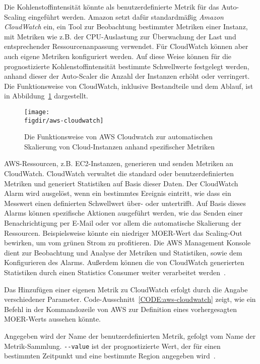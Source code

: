 Die Kohlenstoffintensität könnte als benutzerdefinierte Metrik für das Auto-Scaling eingeführt werden.
Amazon setzt dafür standardmäßig \textit{Amazon CloudWatch} ein, ein Tool zur Beobachtung bestimmter Metriken einer Instanz, mit Metriken wie z.B. der \ac{CPU}-Auslastung zur Überwachung der Last und entsprechender Ressourcenanpassung verwendet.
Für CloudWatch können aber auch eigene Metriken konfiguriert werden.
Auf diese Weise können für die prognostizierte Kohlenstoffintensität bestimmte Schwellwerte festgelegt werden, anhand dieser der Auto-Scaler die Anzahl der Instanzen erhöht oder verringert.
Die Funktionsweise von CloudWatch, inklusive Bestandteile und dem Ablauf, ist in Abbildung~\ref{FIG:aws-cloudwatch} dargestellt.
\begin{figure}
 \caption[Funktionsweise AWS Cloudwatch]{Die Funktionsweise von \ac{AWS} Cloudwatch zur automatischen Skalierung von Cloud-Instanzen anhand spezifischer Metriken~\cite{AmazonWebServices.20240320T16:42:17.000Z}}
 {\texttt{[image: \\figdir/aws-cloudwatch]}}
 \label{FIG:aws-cloudwatch}
\end{figure}
AWS-Ressourcen, z.B. EC2-Instanzen, generieren und senden Metriken an CloudWatch.
CloudWatch verwaltet die standard oder benutzerdefinierten Metriken und generiert Statistiken auf Basis dieser Daten.
Der CloudWatch Alarm wird ausgelöst, wenn ein bestimmtes Ereignis eintritt, wie dass ein Messwert einen definierten Schwellwert über- oder untertrifft.
Auf Basis dieses Alarms können spezifische Aktionen ausgeführt werden, wie das Senden einer Benachrichtigung per E-Mail oder vor allem die automatische Skalierung der Ressourcen.
Beispielsweise könnte ein niedriger \ac{MOER}-Wert das Scaling-Out bewirken, um vom grünen Strom zu profitieren.
Die AWS Management Konsole dient zur Beobachtung und Analyse der Metriken und Statistiken, sowie dem Konfigurieren des Alarms.
Außerdem können die von CloudWatch generierten Statistiken durch einen Statistics Consumer weiter verarbeitet werden~\cite{AmazonWebServices.20240320T16:42:17.000Z}.

Das Hinzufügen einer eigenen Metrik zu CloudWatch erfolgt durch die Angabe verschiedener Parameter.
Code-Ausschnitt~\ref{CODE:aws-cloudwatch} zeigt, wie ein Befehl in der Kommandozeile von AWS zur Definition eines vorhergesagten \ac{MOER}-Werts aussehen könnte.

Angegeben wird der Name der benutzerdefinierten Metrik, gefolgt vom Name der Metrik-Sammlung.
\lstinline[columns=fixed]{--value} ist der prognostizierte Wert, der für einen bestimmten Zeitpunkt und eine bestimmte Region angegeben wird~\cite{AmazonWebServices.20240320T16:42:17.000Z}.

